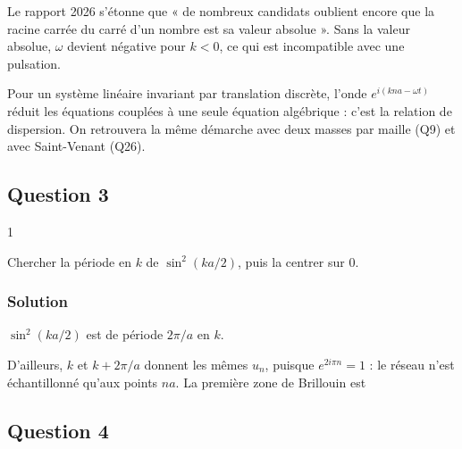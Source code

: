 \documentclass[11pt,a4paper]{article}
\newcommand{\equationajustee}[1]{%
  \sbox{\boiteequation}{$\displaystyle #1$}%
  \ifdim\wd\boiteequation>\linewidth
    \[\resizebox{\linewidth}{!}{\usebox{\boiteequation}}\]%
  \else
    \[#1\]%
  \fi}
\begin{document}
\equationajustee{\boxed{\omega(k)=2\sqrt{\frac{\beta}{m}}\,\left|\sin\frac{ka}{2}\right|}}

\begin{jury}

Le rapport 2026 s'étonne que « de nombreux candidats oublient encore que la racine carrée du carré d'un nombre est sa valeur absolue ». Sans la valeur absolue, \(\omega\) devient négative pour \(k<0\), ce qui est incompatible avec une pulsation.

\end{jury}

\begin{methode}

Pour un système linéaire invariant par translation discrète, l'onde \(e^{i(kna-\omega t)}\) réduit les équations couplées à une seule équation algébrique : c'est la relation de dispersion. On retrouvera la même démarche avec deux masses par maille (Q9) et avec Saint-Venant (Q26).

\end{methode}

\hypertarget{question-3}{%
\subsection{Question 3}\label{question-3}}

\begin{indication}{1}

Chercher la période en \(k\) de \(\sin^2(ka/2)\), puis la centrer sur \(0\).

\end{indication}

\hypertarget{solution-2}{%
\subsubsection{Solution}\label{solution-2}}

\(\sin^2(ka/2)\) est de période \(2\pi/a\) en \(k\).

D'ailleurs, \(k\) et \(k+2\pi/a\) donnent les mêmes \(u_n\), puisque \(e^{2i\pi n}=1\) : le réseau n'est échantillonné qu'aux points \(na\). La première zone de Brillouin est

\equationajustee{\boxed{k\in\left[-\frac{\pi}{a},\frac{\pi}{a}\right]}}

\hypertarget{question-4}{%
\subsection{Question 4}\label{question-4}}
\end{document}
